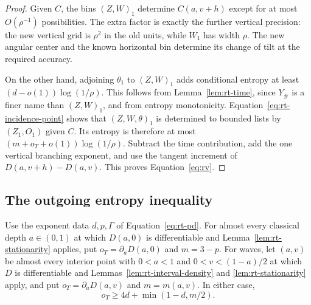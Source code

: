 \begin{proof}
Given $C$, the bins $(Z,W)_1$ determine $C(a,v+h)$ except
for at most $O(\rho^{-1})$ possibilities.  The extra factor is
exactly the further vertical precision: the new vertical grid is
$\rho^2$ in the old units, while $W_1$ has width $\rho$.
The new angular center and the known horizontal bin determine its
change of tilt at the required accuracy.

On the other hand, adjoining $\theta_1$ to $(Z,W)_1$ adds
conditional entropy at least $(d-o(1))\log(1/\rho)$.
This follows from Lemma~\ref{lem:rt-time}, since $Y_\#$ is a
finer name than $(Z,W)_1$, and from entropy monotonicity.
Equation~\eqref{eq:rt-incidence-point} shows that
$(Z,W,\theta)_1$ is determined to bounded lists by $(Z_1,O_1)$
given $C$.  Its entropy is therefore at most
$(m+o_T+o(1))\log(1/\rho)$.
Subtract the time contribution, add the one vertical branching
exponent, and use the tangent increment of $D(a,v+h)-D(a,v)$.
This proves Equation~\eqref{eq:rv}.
\end{proof}

\subsection{The outgoing entropy inequality}

\begin{proposition}\label{prop:rt-outgoing}
Use the exponent data $d,p,\Gamma$ of Equation~\eqref{eq:rt-pd}.
For almost every classical depth $a\in(0,1)$ at which
$D(a,0)$ is differentiable and Lemma~\ref{lem:rt-stationarity}
applies, put $o_T=\partial_aD(a,0)$ and $m=3-p$.
For waves, let $(a,v)$ be almost every interior point with
$0<a<1$ and $0<v<(1-a)/2$ at which $D$ is differentiable and
Lemmas~\ref{lem:rt-interval-density} and \ref{lem:rt-stationarity}
apply, and put $o_T=\partial_aD(a,v)$ and $m=m(a,v)$.
In either case,
\begin{equation}
 o_T\ge4d+\min(1-d,m/2).
 \tag{round-out}\label{eq:round-out}
\end{equation}
\end{proposition}

